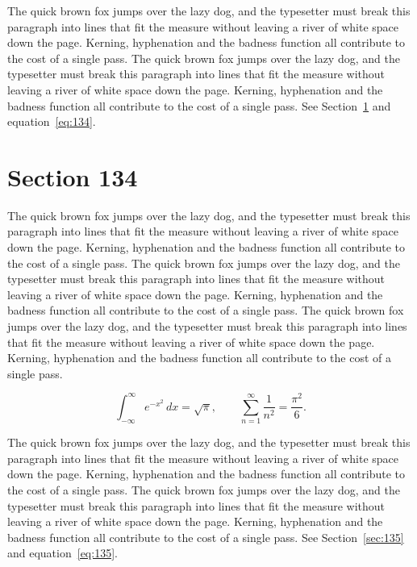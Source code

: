 \documentclass{article}
\begin{document}
The quick brown fox jumps over the lazy dog, and the typesetter must break this paragraph into lines that fit the measure without leaving a river of white space down the page. Kerning, hyphenation and the badness function all contribute to the cost of a single pass. The quick brown fox jumps over the lazy dog, and the typesetter must break this paragraph into lines that fit the measure without leaving a river of white space down the page. Kerning, hyphenation and the badness function all contribute to the cost of a single pass. 
See Section~\ref{sec:134} and equation~\eqref{eq:134}.
\section{Section 134}
\label{sec:134}
The quick brown fox jumps over the lazy dog, and the typesetter must break this paragraph into lines that fit the measure without leaving a river of white space down the page. Kerning, hyphenation and the badness function all contribute to the cost of a single pass. The quick brown fox jumps over the lazy dog, and the typesetter must break this paragraph into lines that fit the measure without leaving a river of white space down the page. Kerning, hyphenation and the badness function all contribute to the cost of a single pass. The quick brown fox jumps over the lazy dog, and the typesetter must break this paragraph into lines that fit the measure without leaving a river of white space down the page. Kerning, hyphenation and the badness function all contribute to the cost of a single pass. 

\begin{equation}\label{eq:134}
\int_{-\infty}^{\infty} e^{-x^{2}}\,dx = \sqrt{\pi}, \qquad
\sum_{n=1}^{\infty} \frac{1}{n^{2}} = \frac{\pi^{2}}{6}.
\end{equation}

The quick brown fox jumps over the lazy dog, and the typesetter must break this paragraph into lines that fit the measure without leaving a river of white space down the page. Kerning, hyphenation and the badness function all contribute to the cost of a single pass. The quick brown fox jumps over the lazy dog, and the typesetter must break this paragraph into lines that fit the measure without leaving a river of white space down the page. Kerning, hyphenation and the badness function all contribute to the cost of a single pass. 
See Section~\ref{sec:135} and equation~\eqref{eq:135}.
\end{document}
